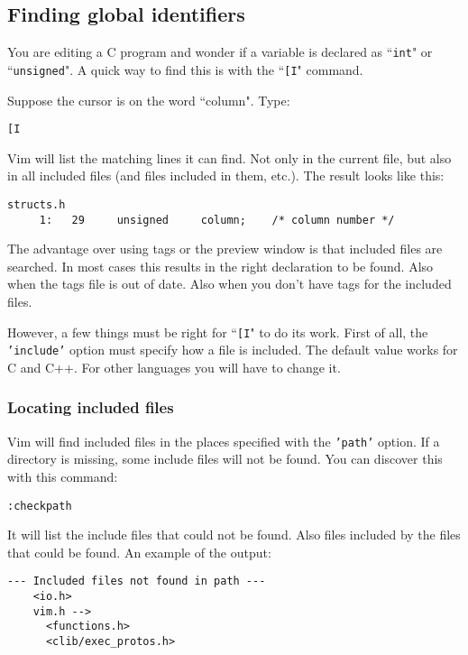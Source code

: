 \subsection{Finding global identifiers}
You are editing a C program and wonder if a variable is declared as ``\texttt{int}" or ``\texttt{unsigned}".
A quick way to find this is with the ``\texttt{[I}" command.

Suppose the cursor is on the word ``column".
Type:

\begin{Verbatim}[samepage=true]
 [I
\end{Verbatim}

Vim will list the matching lines it can find.
Not only in the current file, but also in all included files (and files included in them, etc.).
The result looks like this:

\begin{Verbatim}[samepage=true]
    structs.h
     1:   29     unsigned     column;    /* column number */
\end{Verbatim}

The advantage over using tags or the preview window is that included files are searched.
In most cases this results in the right declaration to be found.
Also when the tags file is out of date.
Also when you don't have tags for the included files.

However, a few things must be right for ``\texttt{[I}" to do its work.
First of all, the \texttt{'include'} option must specify how a file is included.
The default value works for C and C++.
For other languages you will have to change it.
\subsubsection{Locating included files}
Vim will find included files in the places specified with the \texttt{'path'} option.
If a directory is missing, some include files will not be found.
You can discover this with this command:

\begin{Verbatim}[samepage=true]
 :checkpath
\end{Verbatim}

It will list the include files that could not be found.
Also files included by the files that could be found.
An example of the output:

\begin{Verbatim}[samepage=true]
    --- Included files not found in path ---
    <io.h>
    vim.h -->
      <functions.h>
      <clib/exec_protos.h>
\end{Verbatim}

